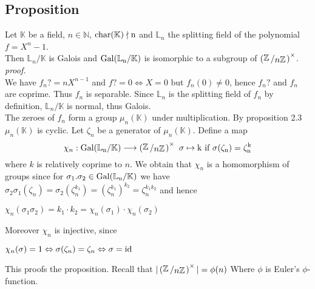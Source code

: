\documentclass[12pt]{book}
\newcommand{\slant}[2]{{\raisebox{.1em}{$#1$}\left/\raisebox{-.1em}{$#2$}\right.}}
\begin{document}
\begin{spacing}{1.3}
\subsection{Proposition } %
\titleformat{\subsection}{\normalfont\normalsize\bfseries}{}{0em}{#1 \thesubsection}
Let $\mathbb{K}$ be a field, $n \in \mathbb{N}$, $\rm{char}(\mathbb{K}) \nmid n$ and $\mathbb{L}_n$ the splitting field of the polynomial $f=X^n-1$.\\
Then $\mathbb{L}_n/\mathbb{K}$ is Galois and $\rm{Gal}(\mathbb{L}_n/\mathbb{K})$ is isomorphic to a subgroup of $\left(\slant{\mathbb{Z}}{n \mathbb{Z}}\right)^{\times}$.\\
\textit{proof.}\\
We have $f_n?=n X^{n-1}$ and $f?=0 \Leftrightarrow X=0$ but $f_n(0)\neq 0$, hence $f_n?$ and $f_n$ are coprime. Thus $f_n$ is separable. Since $\mathbb{L}_n$ is the splitting field of $f_n$ by definition, $\mathbb{L}_n/\mathbb{K}$ is normal, thus Galois.\\
The zeroes of $f_n$ form a group $\mu_n(\mathbb{K})$ under multiplication. By proposition 2.3 $\mu_n(\mathbb{K})$ is cyclic. Let $\zeta_n$ be a generator of $\mu_n(\mathbb{K})$. Define a map
$$ \chi_n: \rm{Gal}(\mathbb{L}_n/\mathbb{K}) \longrightarrow \left(\slant{\mathbb{Z}}{n \mathbb{Z}}\right)^{\times}\textrm{ }\sigma \mapsto k\textrm{ if }\sigma(\zeta_n)=\zeta_n^k$$
where $k$ is relatively coprime to $n$. We obtain that $\chi_n$ is a homomorphism of groups since for $\sigma_1. \sigma_2 \in \rm{Gal}(\mathbb{L}_n/\mathbb{K})$ we have $ \sigma_2 \sigma_1(\zeta_n)=\sigma_2 \left(\zeta_n^{k_1}\right)=\left(\zeta_n^{k_1}\right)^{k_2}=\zeta_n^{k_1 k_2}$
and hence 
\begin{center}$ \chi_n \left( \sigma_1 \sigma_2 \right)=k_1 \cdot k_2 = \chi_n(\sigma_1) \cdot \chi_n(\sigma_2)$\end{center}
Moreover $\chi_n$ is injective, since
\begin{center}$ \chi_n(\sigma)=1 \Leftrightarrow \sigma(\zeta_n)= \zeta_n \Leftrightarrow \sigma= \rm{id}$\end{center}
This proofs the proposition. Recall that $\vert \left( \slant{\mathbb{Z}}{n \mathbb{Z}}\right)^{\times} \vert = \phi(n)$ Where $\phi$ is Euler's $\phi$-function.
\newpage


\renewcommand*\thesection{\S\ \arabic{section}\quad}

\end{spacing}
\end{document}

